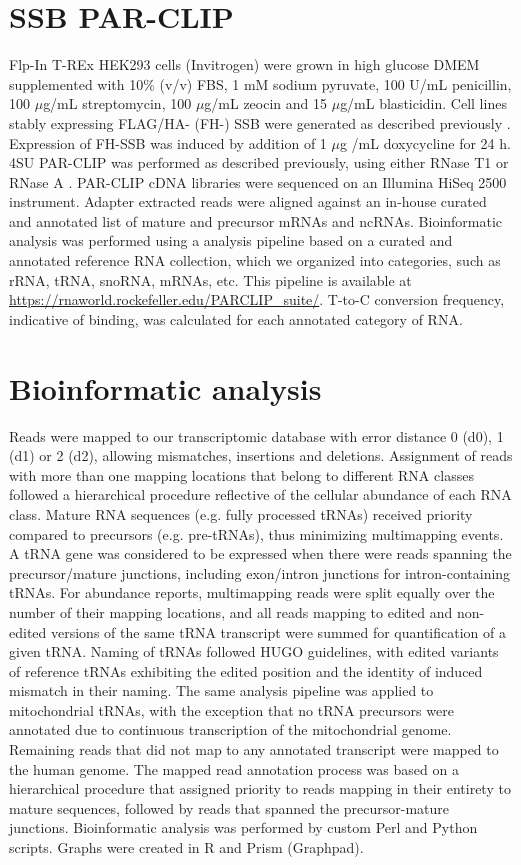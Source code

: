 \documentclass[12pt]{rockefeller}
\begin{document}
\section{SSB PAR-CLIP}
Flp-In T-REx HEK293 cells (Invitrogen) were grown in high glucose DMEM supplemented with 10\% (v/v) FBS, 1 mM sodium pyruvate, 100 U/mL penicillin, 100 $\mu$g/mL streptomycin, 100 $\mu$g/mL zeocin and 15 $\mu$g/mL blasticidin. Cell lines stably expressing FLAG/HA- (FH-) SSB were generated as described previously \cite{Spitzer:2013fk}. Expression of FH-SSB was induced by addition of 1 $\mu$g /mL doxycycline for 24 h. 4SU PAR-CLIP was performed as described previously, using either RNase T1 or RNase A \cite{Garzia:2016cx}. PAR-CLIP cDNA libraries were sequenced on an Illumina HiSeq 2500 instrument. Adapter extracted reads were aligned against an in-house curated and annotated list of mature and precursor mRNAs and ncRNAs. Bioinformatic analysis was performed using a analysis pipeline based on a curated and annotated reference RNA collection, which we organized into categories, such as rRNA, tRNA, snoRNA, mRNAs, etc. This pipeline is available at \url{https://rnaworld.rockefeller.edu/PARCLIP_suite/}. T-to-C conversion frequency, indicative of binding, was calculated for each annotated category of RNA. 

\section{Bioinformatic analysis}
Reads were mapped to our transcriptomic database with error distance 0 (d0), 1 (d1) or 2 (d2), allowing mismatches, insertions and deletions. Assignment of reads with more than one mapping locations that belong to different RNA classes followed a hierarchical procedure reflective of the cellular abundance of each RNA class. Mature RNA sequences (e.g. fully processed tRNAs) received priority compared to precursors (e.g. pre-tRNAs), thus minimizing multimapping events. A tRNA gene was considered to be expressed when there were reads spanning the precursor/mature junctions, including exon/intron junctions for intron-containing tRNAs. For abundance reports, multimapping reads were split equally over the number of their mapping locations, and all reads mapping to edited and non-edited versions of the same tRNA transcript were summed for quantification of a given tRNA. Naming of tRNAs followed HUGO guidelines, with edited variants of reference tRNAs exhibiting the edited position and the identity of induced mismatch in their naming. The same analysis pipeline was applied to mitochondrial tRNAs, with the exception that no tRNA precursors were annotated due to continuous transcription of the mitochondrial genome. Remaining reads that did not map to any annotated transcript were mapped to the human genome. The mapped read annotation process was based on a hierarchical procedure that assigned priority to reads mapping in their entirety to mature sequences, followed by reads that spanned the precursor-mature junctions. Bioinformatic analysis was performed by custom Perl and Python scripts. Graphs were created in R and Prism (Graphpad).
\end{document}
